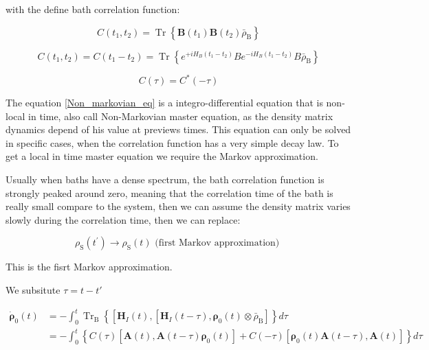 \documentclass[%
preprint,
onecolumn,
notitlepag,
 amsmath,amssymb,
 aps,
 pra,
]{revtex4-2}
\begin{document}
with the define bath correlation function: 

\begin{equation}C\left(t_{1}, t_{2}\right)=\operatorname{Tr}\left\{\boldsymbol{B}\left(t_{1}\right) \boldsymbol{B}\left(t_{2}\right) \bar{\rho}_{\mathrm{B}}\right\}\end{equation}




\begin{equation}C\left(t_{1}, t_{2}\right)=C\left(t_{1}-t_{2}\right)=\operatorname{Tr}\left\{e^{+i H_{B}\left(t_{1}-t_{2}\right)} B e^{-i H_{B}\left(t_{1}-t_{2}\right)} B \bar{\rho}_{\mathrm{B}}\right\}\end{equation}

\begin{equation}C(\tau)=C^{*}(-\tau)\end{equation}

The equation \ref{Non_markovian_eq} is a integro-differential equation that is non-local in time, also call Non-Markovian master equation, as the density matrix dynamics depend of  his value at previews times. This equation can only be solved in specific cases, when the correlation function has a very simple decay law. To get a local in time master equation we require  the Markov approximation.

Usually when baths have a dense spectrum, the bath correlation function is strongly peaked around zero, meaning that the correlation time of the bath is really small compare to the system, then we can assume the density matrix varies slowly during the correlation time, then  we can replace: 


\begin{equation}\rho_{\mathrm{S}}\left(t^{\prime}\right) \rightarrow \rho_{\mathrm{S}}(t) \text { (first Markov approximation) }\end{equation}

This is the fisrt Markov approximation.  

We subsitute $\tau=t-t'$


\begin{equation}\begin{aligned}
\dot{\boldsymbol{\rho}}_0(t) &=-\int_{0}^{t} \operatorname{Tr}_{\mathrm{B}}\left\{\left[\boldsymbol{H}_{I}(t),\left[\boldsymbol{H}_{I}(t-\tau), \boldsymbol{\rho}_{\mathrm{0}}(t) \otimes \bar{\rho}_{\mathrm{B}}\right]\right\} d \tau\right.\\
&=- \int_{0}^{t}\left\{C(\tau)\left[\boldsymbol{A}(t), \boldsymbol{A}(t-\tau) \boldsymbol{\rho}_{\mathrm{0}}(t)\right]+C(-\tau)\left[\boldsymbol{\rho}_{\mathrm{0}}(t) \boldsymbol{A}(t-\tau), \boldsymbol{A}(t)\right]\right\} d \tau
\end{aligned}\end{equation}
\end{document}
